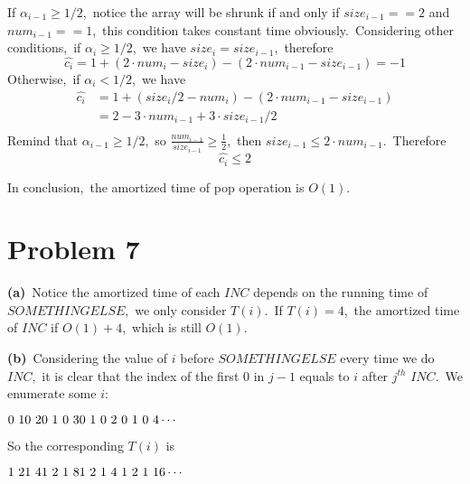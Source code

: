 \documentclass[]{article}
\begin{document}
    If $\alpha_{i-1}\geq 1/2$,\ notice the array will be shrunk if and only if $size_{i-1} == 2$ and $num_{i-1} == 1$,\ this condition takes constant time obviously.\ Considering other conditions,\ if $\alpha_{i}\geq 1/2$,\ we have $size_i = size_{i-1}$,\ therefore
    \begin{equation*}
    \hat{c_i} = 1 + (2\cdot num_i - size_i) - (2\cdot num_{i-1} - size_{i-1}) = -1
    \end{equation*}
    Otherwise,\ if $\alpha_i< 1/2$,\ we have
    \begin{equation*}
    \begin{aligned}
    \hat{c_i} &= 1 + (size_i/2 - num_i) - (2\cdot num_{i-1} - size_{i-1})\\
    &= 2 - 3\cdot num_{i-1} + 3\cdot size_{i-1}/2\\
    \end{aligned}
    \end{equation*}
    Remind that $\alpha_{i-1}\geq 1/2$,\ so $\frac{num_{i-1}}{size_{i-1}}\geq \frac{1}{2}$,\ then $size_{i-1}\leq 2\cdot num_{i-1}$.\ Therefore
    \begin{equation*}
    \hat{c_i} \leq 2
    \end{equation*}
    
    In conclusion,\ the amortized time of pop operation is $O(1)$.
    
    \section{Problem 7}
    \textbf{(a)}\ Notice the amortized time of each $INC$ depends on the running time of $SOMETHINGELSE$,\ we only consider $T(i)$.\ If $T(i)=4$,\ the amortized time of $INC$ if $O(1) + 4$,\ which is still $O(1)$.
    
    \textbf{(b)}\ Considering the value of $i$ before $SOMETHINGELSE$ every time we do $INC$,\ it is clear that the index of the first $0$ in $j-1$ equals to $i$ after $j^{th}$ $INC$.\ We enumerate some $i$:
    
    $\\
     0\ 1\\
     0\ 2\\
     0\ 1\ 0\ 3\\
     0\ 1\ 0\ 2\ 0\ 1\ 0\ 4\\
     \cdots$
     
     So the corresponding $T(i)$ is 
     
     $\\
      1\ 2\\
      1\ 4\\
      1\ 2\ 1\ 8\\
      1\ 2\ 1\ 4\ 1\ 2\ 1\ 16\\
      \cdots 
     $
     
\end{document}

